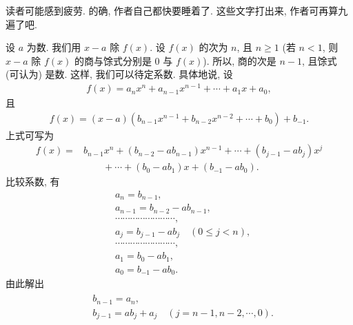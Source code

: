\begin{example}
    读者可能感到疲劳. 的确, 作者自己都快要睡着了. 这些文字打出来, 作者可再算九遍了吧.
\end{example}

设 $a$ 为数. 我们用 $x-a$ 除 $f(x)$. 设 $f(x)$ 的次为 $n$, 且 $n \geq 1$ (若 $n < 1$, 则 $x-a$ 除 $f(x)$ 的商与馀式分别是 $0$ 与 $f(x)$). 所以, 商的次是 $n-1$, 且馀式 (可认为) 是数. 这样, 我们可以待定系数. 具体地说, 设
\begin{align*}
    f(x) = a_n x^n + a_{n-1} x^{n-1} + \cdots + a_1 x + a_0,
\end{align*}
且
\begin{align*}
    f(x) = (x - a) (b_{n-1} x^{n-1} + b_{n-2} x^{n-2} + \cdots + b_0) + b_{-1}.
\end{align*}
上式可写为
\begin{align*}
    f(x)
    = {} & b_{n-1} x^n + (b_{n-2} - ab_{n-1}) x^{n-1} + \cdots + (b_{j-1} - ab_j) x^j \\
         & \qquad + \cdots + (b_0 - ab_1) x + (b_{-1} - ab_0).
\end{align*}
比较系数, 有
\begin{align*}
     & a_n = b_{n-1},                                           \\
     & a_{n-1} = b_{n-2} - ab_{n-1},                            \\
     & \cdots \cdots \cdots \cdots \cdots \cdots \cdots \cdots, \\
     & a_j = b_{j-1} - ab_j \quad (0 \leq j < n),               \\
     & \cdots \cdots \cdots \cdots \cdots \cdots \cdots \cdots, \\
     & a_1 = b_0 - ab_1,                                        \\
     & a_0 = b_{-1} - ab_0.
\end{align*}
由此解出
\begin{align*}
    \tag*{(R)} \begin{aligned}
         & b_{n-1} = a_n,                                     \\
         & b_{j-1} = ab_j + a_j \quad (j = n-1,n-2,\cdots,0).
    \end{aligned}
\end{align*}

